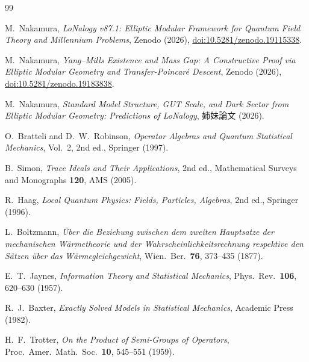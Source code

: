 \documentclass[12pt]{article}
\theoremstyle{plain}
\theoremstyle{definition}
\numberwithin{equation}{section}
\begin{document}
\begin{thebibliography}{99}

M.~Nakamura,
\textit{LoNalogy v87.1: Elliptic Modular Framework for Quantum Field Theory
and Millennium Problems},
Zenodo (2026), \href{https://doi.org/10.5281/zenodo.19115338}{doi:10.5281/zenodo.19115338}.

M.~Nakamura,
\textit{Yang--Mills Existence and Mass Gap: A Constructive Proof via
Elliptic Modular Geometry and Transfer-Poincar\'e Descent},
Zenodo (2026), \href{https://doi.org/10.5281/zenodo.19183838}{doi:10.5281/zenodo.19183838}.

M.~Nakamura,
\textit{Standard Model Structure, GUT Scale, and Dark Sector from Elliptic
Modular Geometry: Predictions of LoNalogy},
姉妹論文 (2026).

O.~Bratteli and D.~W.~Robinson,
\textit{Operator Algebras and Quantum Statistical Mechanics},
Vol.~2, 2nd ed., Springer (1997).

B.~Simon,
\textit{Trace Ideals and Their Applications},
2nd ed., Mathematical Surveys and Monographs \textbf{120},
AMS (2005).

R.~Haag,
\textit{Local Quantum Physics: Fields, Particles, Algebras},
2nd ed., Springer (1996).

L.~Boltzmann,
\textit{\"Uber die Beziehung zwischen dem zweiten Hauptsatze der
mechanischen W\"armetheorie und der Wahrscheinlichkeitsrechnung
respektive den S\"atzen \"uber das W\"armegleichgewicht},
Wien.\ Ber.\ \textbf{76}, 373--435 (1877).

E.~T.~Jaynes,
\textit{Information Theory and Statistical Mechanics},
Phys.\ Rev.\ \textbf{106}, 620--630 (1957).

R.~J.~Baxter,
\textit{Exactly Solved Models in Statistical Mechanics},
Academic Press (1982).

H.~F.~Trotter,
\textit{On the Product of Semi-Groups of Operators},
Proc.\ Amer.\ Math.\ Soc.\ \textbf{10}, 545--551 (1959).

\end{thebibliography}
\end{document}

